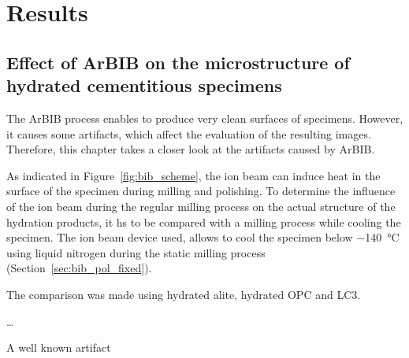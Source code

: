 \chapter{Results}



\section{Effect of \acs*{ArBIB} on the microstructure of hydrated cementitious specimens}

The \ac{ArBIB} process enables to produce very clean surfaces of specimens.%
However, it causes some artifacts, which affect the evaluation of the resulting images.
Therefore, this chapter takes a closer look at the artifacts caused by \ac{ArBIB}.


As indicated in Figure~\ref{fig:bib_scheme}, the ion beam can induce heat in the surface of the specimen during milling and polishing.
To determine the influence of the ion beam during the regular milling process on the actual structure of the hydration products, it hs to be compared with a milling process while cooling the specimen.
The ion beam device used, allows to cool the specimen below {\color{red} \SI{-140}{\celsius}} using liquid nitrogen during the static milling process (Section~\ref{sec:bib_pol_fixed}).

The comparison was made using hydrated alite, hydrated \ac{OPC} and \ac{LC3}.

\dots

A well known artifact